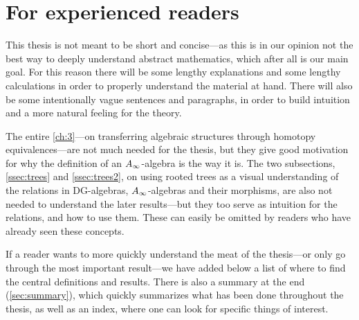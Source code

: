 

\section{For experienced readers}

This thesis is not meant to be short and concise---as this is in our opinion not the best way to deeply understand abstract mathematics, which after all is our main goal. For this reason there will be some lengthy explanations and some lengthy calculations in order to properly understand the material at hand. There will also be some intentionally vague sentences and paragraphs, in order to build intuition and a more natural feeling for the theory. 

The entire \cref{ch:3}---on transferring algebraic structures through homotopy equivalences---are not much needed for the thesis, but they give good motivation for why the definition of an $A_{\infty}$-algebra is the way it is. The two subsections, \cref{ssec:trees} and \cref{ssec:trees2}, on using rooted trees as a visual understanding of the relations in DG-algebras, $A_{\infty}$-algebras and their morphisms, are also not needed to understand the later results---but they too serve as intuition for the relations, and how to use them. These can easily be omitted by readers who have already seen these concepts. 

If a reader wants to more quickly understand the meat of the thesis---or only go through the most important result---we have added below a list of where to find the central definitions and results. There is also a summary at the end (\cref{sec:summary}), which quickly summarizes what has been done throughout the thesis, as well as an index, where one can look for specific things of interest. 

